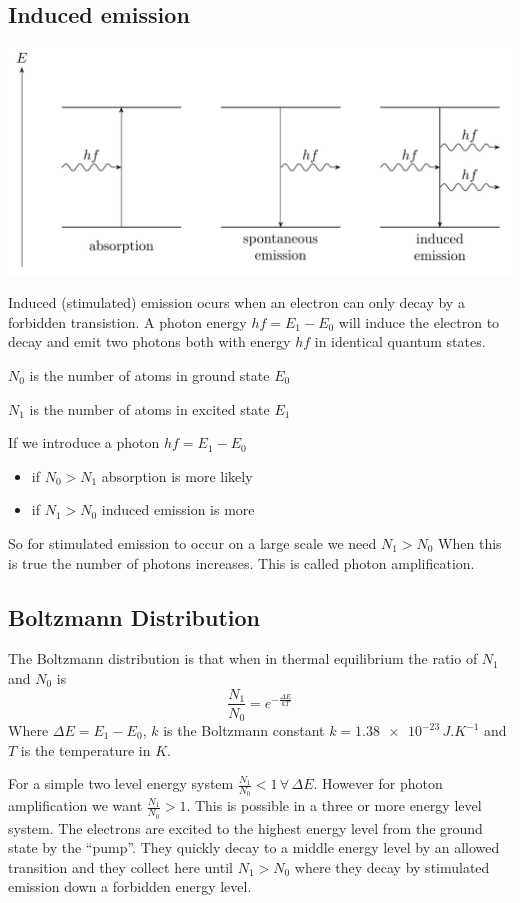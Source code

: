 \documentclass{article}
\newcommand{\A}{\forall\,}
\begin{document}
\subsection*{Induced emission}

\begin{center}
\includegraphics[scale=0.3]{EmissionAbsorptionTypes}
\end{center}
Induced (stimulated) emission ocurs when an electron can only decay by a forbidden transistion. A photon energy \(hf=E_1-E_0\) will induce the electron to decay and emit two photons both with energy \(hf\) in identical quantum states.

\(N_0\) is the number of atoms in ground state \(E_0\)

\(N_1\) is the number of atoms in excited state \(E_1\)

If we introduce a photon \(hf=E_1-E_0\)
\begin{itemize}
\item if \(N_0>N_1\) absorption is more likely
\item if \(N_1>N_0\) induced emission is more
\end{itemize}
So for stimulated emission to occur on a large scale we need \(N_1>N_0\) When this is true the number of photons increases. This is called photon amplification.

\subsection*{Boltzmann Distribution}

The Boltzmann distribution is that when in thermal equilibrium the ratio of \(N_1\) and \(N_0\) is
\[\frac{N_1}{N_0}=e^{-\frac{\Delta E}{kT}}\]
Where \(\Delta E=E_1-E_0\), \(k\) is the Boltzmann constant \(k=\num{1.38e-23}\,\si{J.K^{-1}}\) and \(T\) is the temperature in \(K\).

For a simple two level energy system \(\frac{N_1}{N_0}<1\,\A \Delta E\). However for photon amplification we want \(\frac{N_1}{N_0}>1\). This is possible in a three or more energy level system. The electrons are excited to the highest energy level from the ground state by the ``pump''. They quickly decay to a middle energy level by an allowed transition and they collect here until \(N_1>N_0\) where they decay by stimulated emission down a forbidden energy level.
\end{document}
